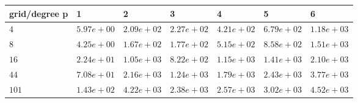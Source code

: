\begin{tabular}{lllllll}
\hline
 grid/degree p   & 1          & 2          & 3          & 4          & 5          & 6          \\
\hline
 $4$             & $5.97e+00$ & $2.09e+02$ & $2.27e+02$ & $4.21e+02$ & $6.79e+02$ & $1.18e+03$ \\
 $8$             & $4.25e+00$ & $1.67e+02$ & $1.77e+02$ & $5.15e+02$ & $8.58e+02$ & $1.51e+03$ \\
 $16$            & $2.24e+01$ & $1.05e+03$ & $8.22e+02$ & $1.15e+03$ & $1.41e+03$ & $2.10e+03$ \\
 $44$            & $7.08e+01$ & $2.16e+03$ & $1.24e+03$ & $1.79e+03$ & $2.43e+03$ & $3.77e+03$ \\
 $101$           & $1.43e+02$ & $4.22e+03$ & $2.38e+03$ & $2.57e+03$ & $3.02e+03$ & $4.52e+03$ \\
\hline
\end{tabular}